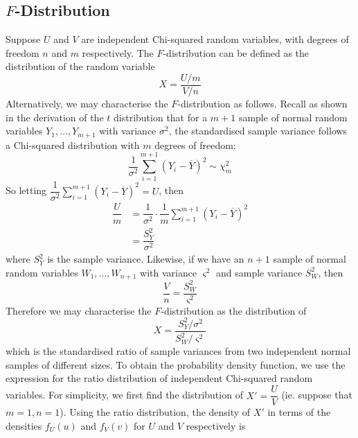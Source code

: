 \documentclass[11pt]{report} %
\begin{document}
\subsection{$F$-Distribution}

Suppose $U$ and $V$ are independent Chi-squared random variables, with degrees of freedom $n$ and $m$ respectively. The $F$-distribution can be defined as the distribution of the random variable
\begin{equation}
X = \dfrac{U/m}{V/n}
\end{equation}
Alternatively, we may characterise the $F$-distribution as follows. Recall as shown in the derivation of the $t$ distribution that for a $m+1$ sample of normal random variables $Y_{1}, \dots, Y_{m + 1}$ with variance $\sigma^{2}$, the standardised sample variance follows a Chi-squared distribution with $m$ degrees of freedom:
\begin{equation}
\dfrac{1}{\sigma^{2}} \sum_{i = 1}^{m + 1}\left(Y_{i} - \overline{Y}\right)^{2} \sim \chi_{m}^{2}
\end{equation}
So letting $\dfrac{1}{\sigma^{2}} \sum_{i = 1}^{m + 1}\left(Y_{i} - \overline{Y}\right)^{2} = U$, then
\begin{align}
\dfrac{U}{m} &= \dfrac{1}{\sigma^{2}}\cdot\dfrac{1}{m}\sum_{i = 1}^{m + 1}\left(Y_{i} - \overline{Y}\right)^{2} \\
&= \dfrac{S_{Y}^{2}}{\sigma^{2}}
\end{align}
where $S_{Y}^{2}$ is the sample variance. Likewise, if we have an $n + 1$ sample of normal random variables $W_{1}, \dots, W_{n + 1}$ with variance $\varsigma^{2}$ and sample variance $S_{W}^{2}$, then
\begin{equation}
\dfrac{V}{n} = \dfrac{S_{W}^{2}}{\varsigma^{2}}
\end{equation}
Therefore we may characterise the $F$-distribution as the distribution of
\begin{equation}
X = \dfrac{S_{Y}^{2}/\sigma^{2}}{S_{W}^{2}/\varsigma^{2}}
\end{equation}
which is the standardised ratio of sample variances from two independent normal samples of different sizes. To obtain the probability density function, we use the expression for the ratio distribution of independent Chi-squared random variables. For simplicity, we first find the distribution of $X' = \dfrac{U}{V}$ (ie. suppose that $m = 1, n = 1$). Using the ratio distribution, the density of $X'$ in terms of the densities $f_{U}\left(u\right)$ and $f_{V}\left(v\right)$ for $U$ and $V$ respectively is
\end{document}
